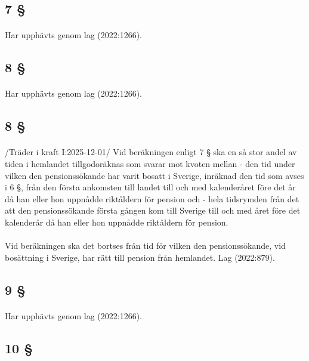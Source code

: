 \documentclass[a4paper,notitlepage,openany,10pt]{book}
\begin{document}
\subsection*{7 §}
\paragraph*{}
Har upphävts genom
lag (2022:1266).
\subsection*{8 §}
\paragraph*{}
Har upphävts genom
lag (2022:1266).
\subsection*{8 §}
\paragraph*{}
/Träder i kraft I:2025-12-01/
Vid beräkningen enligt 7 § ska en så stor andel av tiden i hemlandet tillgodoräknas som svarar mot kvoten mellan
\newline - den tid under vilken den pensionssökande har varit bosatt i Sverige, inräknad den tid som avses i 6 §, från den första ankomsten till landet till och med kalenderåret före det år då han eller hon uppnådde riktåldern för pension och
\newline - hela tidsrymden från det att den pensionssökande första gången kom till Sverige till och med året före det kalenderår då han eller hon uppnådde riktåldern för pension.
\paragraph*{}
Vid beräkningen ska det bortses från tid för vilken den pensionssökande, vid bosättning i Sverige, har rätt till pension från hemlandet.
Lag (2022:879).
\subsection*{9 §}
\paragraph*{}
Har upphävts genom
lag (2022:1266).
\subsection*{10 §}
\end{document}
